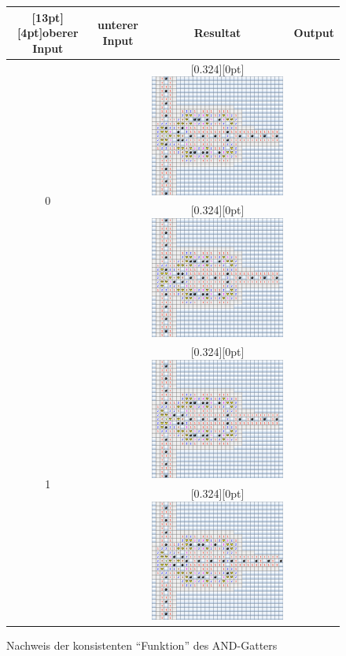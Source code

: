\begin{figure}
\begin{center}
\begin{tabular}{|c|c|c|c|}
\hline
\raisebox{0pt}[13pt][4pt]{oberer Input}&unterer Input&Resultat&Output\\
\hline
\multirow{2}{10pt}{0}&%
\raisebox{11ex}{$0$}&%
\raisebox{0pt}[0.324\hsize][0pt]{%
\includegraphics[width=0.342\hsize]{graphics/and-00}}&%
\raisebox{11ex}{$0$}%
\\
\cline{2-4}
&\raisebox{11ex}{$1$}&%
\raisebox{0pt}[0.324\hsize][0pt]{%
\includegraphics[width=0.342\hsize]{graphics/and-01}}&%
\raisebox{11ex}{$0$}%
\\
\hline
\multirow{2}{10pt}{1}&%
\raisebox{11ex}{$0$}&%
\raisebox{0pt}[0.324\hsize][0pt]{%
\includegraphics[width=0.342\hsize]{graphics/and-10}}&%
\raisebox{11ex}{$0$}%
\\
\cline{2-4}
&\raisebox{11ex}{$1$}&%
\raisebox{0pt}[0.324\hsize][0pt]{%
\includegraphics[width=0.342\hsize]{graphics/and-11}}&%
\raisebox{11ex}{$1$}%
\\
\hline
\end{tabular}
\end{center}
\caption{Nachweis der konsistenten ``Funktion'' des AND-Gatters
\label{andstates}}
\end{figure}%
